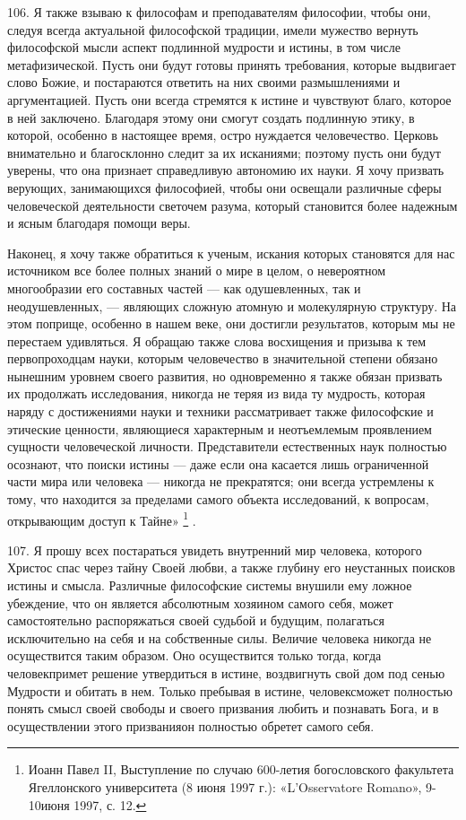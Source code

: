 \documentclass[a5paper,10pt]{article}
\begin{document}
106. Я также взываю к философам и преподавателям философии, чтобы они, следуя
всегда актуальной философской традиции, имели мужество вернуть философской
мысли аспект подлинной мудрости и истины, в том числе метафизической. Пусть они
будут готовы принять требования, которые выдвигает слово Божие, и постараются
ответить на них своими размышлениями и аргументацией. Пусть они всегда
стремятся к истине и чувствуют благо, которое в ней заключено. Благодаря этому
они смогут создать подлинную этику, в которой, особенно в настоящее время,
остро нуждается человечество. Церковь внимательно и благосклонно следит за их
исканиями; поэтому пусть они будут уверены, что она признает справедливую
автономию их науки. Я хочу призвать верующих, занимающихся философией, чтобы
они освещали различные сферы человеческой деятельности светочем разума, который
становится более надежным и ясным благодаря помощи веры.

Наконец, я хочу также обратиться к ученым, искания которых становятся для нас
источником все более полных знаний о мире в целом, о невероятном многообразии
его составных частей — как одушевленных, так и неодушевленных, — являющих
сложную атомную и молекулярную структуру. На этом поприще, особенно в нашем
веке, они достигли результатов, которым мы не перестаем удивляться. Я обращаю
также слова восхищения и призыва к тем первопроходцам науки, которым
человечество в значительной степени обязано нынешним уровнем своего развития,
но одновременно я также обязан призвать их продолжать исследования, никогда не
теряя из вида ту мудрость, которая наряду с достижениями науки и техники
рассматривает также философские и этические ценности, являющиеся характерным и
неотъемлемым проявлением сущности человеческой личности. Представители
естественных наук полностью осознают, что поиски истины — даже если она
касается лишь ограниченной части мира или человека — никогда не прекратятся;
они всегда устремлены к тому, что находится за пределами самого объекта
исследований, к вопросам, открывающим доступ к Тайне» \footnote{Иоанн Павел II,
Выступление по случаю 600-летия богословского факультета Ягеллонского
университета (8 июня 1997 г.): «L'Osservatore Romano», 9-10июня 1997, с. 12.} .

107. Я прошу всех постараться увидеть внутренний мир человека, которого Христос
спас через тайну Своей любви, а также глубину его неустанных поисков истины и
смысла. Различные философские системы внушили ему ложное убеждение, что он
является абсолютным хозяином самого себя, может самостоятельно распоряжаться
своей судьбой и будущим, полагаться исключительно на себя и на собственные
силы. Величие человека никогда не осуществится таким образом. Оно осуществится
только тогда, когда человекпримет решение утвердиться в истине, воздвигнуть
свой дом под сенью Мудрости и обитать в нем. Только пребывая в истине,
человексможет полностью понять смысл своей свободы и своего призвания любить и
познавать Бога, и в осуществлении этого призванияон полностью обретет самого
себя.
\end{document}
